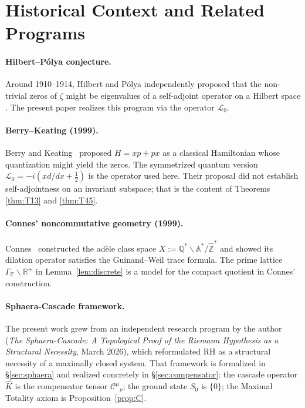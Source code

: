 \documentclass[12pt,a4paper]{article}
\theoremstyle{remark}
\begin{document}
\section{Historical Context and Related Programs}
\label{app:history}

\paragraph{Hilbert--Pólya conjecture.}
Around 1910--1914, Hilbert and Pólya independently proposed that the
non-trivial zeros of $\zeta$ might be eigenvalues of a self-adjoint operator
on a Hilbert space \cite{Bombieri2000}.
The present paper realizes this program via the operator $\mathcal{L}_0$.

\paragraph{Berry--Keating (1999).}
Berry and Keating~\cite{BerryKeating1999} proposed $H=xp+px$ as a classical
Hamiltonian whose quantization might yield the zeros.
The symmetrized quantum version $\mathcal{L}_0=-i(xd/dx+\tfrac{1}{2})$
is the operator used here. Their proposal did not establish self-adjointness
on an invariant subspace; that is the content of Theorems \ref{thm:T13}
and \ref{thm:T45}.

\paragraph{Connes' noncommutative geometry (1999).}
Connes~\cite{Connes1999} constructed the adèle class space
$X:=\mathbb{Q}^*\backslash\mathbb{A}^*/\hat{\mathbb{Z}}^*$
and showed its dilation operator satisfies the Guinand--Weil trace formula.
The prime lattice $\Gamma_\mathbb{P}\backslash\mathbb{R}^+$ in
Lemma~\ref{lem:discrete} is a model for the compact quotient in Connes'
construction.

\paragraph{Sphaera-Cascade framework.}
The present work grew from an independent research program by the author
(\textit{The Sphaera-Cascade: A Topological Proof of the Riemann Hypothesis
as a Structural Necessity}, March 2026), which reformulated RH as a
structural necessity of a maximally closed system.
That framework is formalized in \S\ref{sec:sphaera} and realized
concretely in \S\ref{sec:compensator}:
the cascade operator $\hat{K}$ is the compensator tensor $\mathcal{C}^\mu{}_\nu$;
the ground state $S_0$ is $\{0\}$;
the Maximal Totality axiom is Proposition~\ref{prop:C}.
\end{document}

